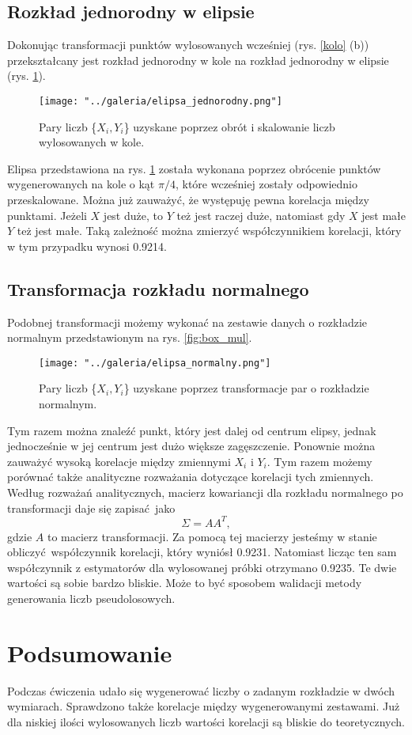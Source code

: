 \documentclass[a4paper, 12pt]{article}
\begin{document}
    \subsection*{Rozkład jednorodny w elipsie}

    Dokonując transformacji punktów wylosowanych wcześniej (rys. \ref{kolo} (b)) przekształcany jest rozkład jednorodny w kole na rozkład jednorodny w elipsie (rys. \ref{elipsa_jednorodny}).

    \begin{figure}[H]
        \centering
        \texttt{[image: "../galeria/elipsa\_jednorodny.png"]}
        \caption{Pary liczb \{$X_i, Y_i$\} uzyskane poprzez obrót i skalowanie liczb wylosowanych w kole.}
        \label{elipsa_jednorodny}
    \end{figure}

    \noaka Elipsa przedstawiona na rys. \ref{elipsa_jednorodny} została wykonana poprzez obrócenie punktów wygenerowanych na kole o kąt $\pi/4$, które wcześniej zostały odpowiednio przeskalowane.
    Można już zauważyć, że występuję pewna korelacja między punktami.
    Jeżeli $X$ jest duże, to $Y$ też jest raczej duże, natomiast gdy $X$ jest małe $Y$ też jest małe.
    Taką zależność można zmierzyć współczynnikiem korelacji, który w tym przypadku wynosi 0.9214.
    
    \subsection*{Transformacja rozkładu normalnego}

    Podobnej transformacji możemy wykonać na zestawie danych o rozkładzie normalnym przedstawionym na rys. \ref{fig:box_mul}.
    \begin{figure}[H]
        \centering
        \texttt{[image: "../galeria/elipsa\_normalny.png"]}
        \caption{Pary liczb \{$X_i, Y_i$\} uzyskane poprzez transformacje par o rozkładzie normalnym.}
        \label{elipsa_normalny}
    \end{figure}

    \noaka Tym razem można znaleźć punkt, który jest dalej od centrum elipsy, jednak jednocześnie w jej centrum jest dużo większe zagęszczenie.
    Ponownie można zauważyć wysoką korelacje między zmiennymi $X_i$ i $Y_i$. 
    Tym razem możemy porównać także analityczne rozważania dotyczące korelacji tych zmiennych.
    Według rozważań analitycznych, macierz kowariancji dla rozkładu normalnego po transformacji daje się zapisać jako
    \[ \Sigma = AA^T, \]
    gdzie $A$ to macierz transformacji.
    Za pomocą tej macierzy jesteśmy w stanie obliczyć współczynnik korelacji, który wyniósł 0.9231.
    Natomiast licząc ten sam współczynnik z estymatorów dla wylosowanej próbki otrzymano 0.9235. 
    Te dwie wartości są sobie bardzo bliskie.
    Może to być sposobem walidacji metody generowania liczb pseudolosowych.

    \newpage

    \section{Podsumowanie}

    Podczas ćwiczenia udało się wygenerować liczby o zadanym rozkładzie w dwóch wymiarach.
    Sprawdzono także korelacje między wygenerowanymi zestawami.
    Już dla niskiej ilości wylosowanych liczb wartości korelacji są bliskie do teoretycznych.
    
\end{document}
